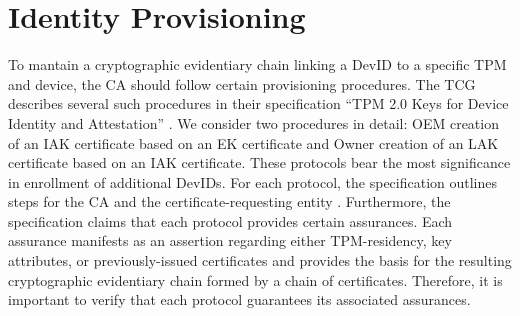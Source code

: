 \documentclass[runningheads]{llncs}
\begin{document}
  

%
%
%
\section{Identity Provisioning}

To mantain a cryptographic evidentiary chain linking a DevID to a
specific TPM and device, the CA should follow certain provisioning
procedures. The TCG describes several such procedures in their
specification ``TPM 2.0 Keys for Device Identity and Attestation''
\citep{DevIDSpec-TCG}.  We consider two procedures in detail: OEM
creation of an IAK certificate based on an EK certificate and Owner
creation of an LAK certificate based on an IAK certificate. These
protocols bear the most significance in enrollment of additional
DevIDs. For each protocol, the specification outlines steps for the CA
and the certificate-requesting entity .  Furthermore, the
specification claims that each protocol provides certain
assurances. Each assurance manifests as an assertion regarding either
TPM-residency, key attributes, or previously-issued certificates and
provides the basis for the resulting cryptographic evidentiary chain
formed by a chain of certificates. Therefore, it is important to
verify that each protocol guarantees its associated assurances.
\end{document}
